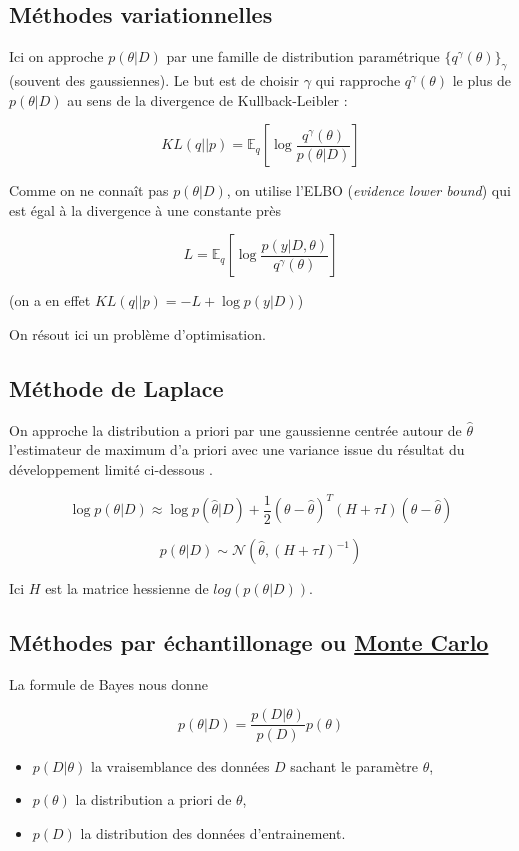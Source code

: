 \documentclass[french,12pt]{article}
\begin{document}
\subsection{Méthodes variationnelles}

Ici on approche $p(\theta | D)$ par une famille de distribution
paramétrique $\{q^{\gamma}(\theta)\}_{\gamma}$ (souvent des gaussiennes).
Le but est de choisir $\gamma$ qui rapproche $q^{\gamma}(\theta)$
le plus de $p(\theta | D)$ au sens de la divergence de Kullback-Leibler :

$$KL(q||p) = \mathbb{E}_q \left[\log \frac{q^{\gamma}(\theta)}{p(\theta | D)}\right]$$

Comme on ne connaît pas $p(\theta | D)$, on utilise l'ELBO (\textit{evidence lower bound})
qui est égal à la divergence à une constante près

$$L =\mathbb{E}_q \left[\log \frac{p(y | D, \theta)}{q^{\gamma}(\theta)}\right]$$

(on a en effet $KL(q||p) = -L +  \log p(y| D)$)

On résout ici un problème d'optimisation.

\subsection{Méthode de Laplace}

On approche la distribution a priori par une gaussienne
centrée autour de $\hat{\theta}$ l'estimateur de maximum d'a priori
avec une variance issue du résultat du développement limité ci-dessous \cite{Uncertainty_Deep} .

$$\log p(\theta | D) \approx \log p(\hat{\theta} | D)
    + \frac{1}{2} (\theta - \hat{\theta})^T (H + \tau I)
    (\theta - \hat{\theta})$$

$$p(\theta | D) \sim \mathcal{N}(\hat{\theta}, (H + \tau I)^{-1})$$

Ici $H$ est la matrice hessienne de $log( p (\theta | D ))$.

\subsection{Méthodes par échantillonage ou \href{https://en.wikipedia.org/wiki/Monte_Carlo_method}{Monte Carlo}}

La formule de Bayes nous donne

$$p(\theta | D) = \frac{p(D | \theta) }{p(D)}p(\theta)$$

\begin{itemize}
    \item $p(D | \theta)$ la vraisemblance des données $D$ sachant le paramètre $\theta$,
    \item $p(\theta)$ la distribution a priori de $\theta$,
    \item $p(D)$ la distribution des données d'entrainement.
\end{itemize}
\end{document}
